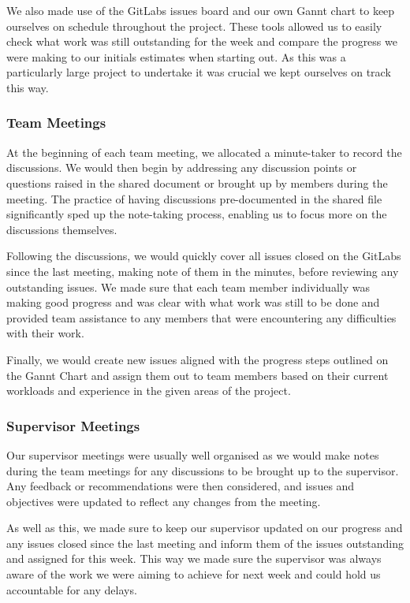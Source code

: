 \documentclass{article}
\begin{document}
We also made use of the GitLabs issues board and our own Gannt chart to keep
ourselves on schedule throughout the project. These tools allowed us to easily
check what work was still outstanding for the week and compare the progress we
were making to our initials estimates when starting out. As this was a
particularly large project to undertake it was crucial we kept ourselves on
track this way.

\subsubsection{Team Meetings}
At the beginning of each team meeting, we allocated a minute-taker to record
the discussions. We would then begin by addressing any discussion points or
questions raised in the shared document or brought up by members during the
meeting. The practice of having discussions pre-documented in the shared file
significantly sped up the note-taking process, enabling us to focus more on the
discussions themselves.

Following the discussions, we would quickly cover all issues closed on the
GitLabs since the last meeting, making note of them in the minutes, before
reviewing any outstanding issues. We made sure that each team member
individually was making good progress and was clear with what work was still to
be done and provided team assistance to any members that were encountering any
difficulties with their work.

Finally, we would create new issues aligned with the progress steps outlined on
the Gannt Chart and assign them out to team members based on their current
workloads and experience in the given areas of the project.

\subsubsection{Supervisor Meetings}
Our supervisor meetings were usually well organised as we would make notes
during the team meetings for any discussions to be brought up to the
supervisor. Any feedback or recommendations were then considered, and issues
and objectives were updated to reflect any changes from the meeting.

As well as this, we made sure to keep our supervisor updated on our progress
and any issues closed since the last meeting and inform them of the issues
outstanding and assigned for this week. This way we made sure the supervisor
was always aware of the work we were aiming to achieve for next week and could
hold us accountable for any delays.
\end{document}
